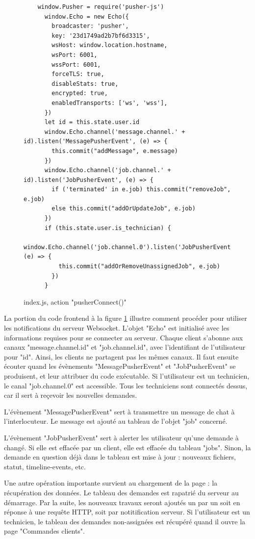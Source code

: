 \documentclass[
    iai, %
    eai, %
]{heig-tb}
\begin{document}
\begin{figure}[h]
  \begin{verbatim}
    window.Pusher = require('pusher-js')
      window.Echo = new Echo({
        broadcaster: 'pusher',
        key: '23d1749ad2b7bf6d3315',
        wsHost: window.location.hostname,
        wsPort: 6001,
        wssPort: 6001,
        forceTLS: true,
        disableStats: true,
        encrypted: true,
        enabledTransports: ['ws', 'wss'],
      })
      let id = this.state.user.id
      window.Echo.channel('message.channel.' + id).listen('MessagePusherEvent', (e) => {
        this.commit("addMessage", e.message)
      })
      window.Echo.channel('job.channel.' + id).listen('JobPusherEvent', (e) => {
        if ('terminated' in e.job) this.commit("removeJob", e.job)
        else this.commit("addOrUpdateJob", e.job)
      })
      if (this.state.user.is_technician) {
        window.Echo.channel('job.channel.0').listen('JobPusherEvent', (e) => {
          this.commit("addOrRemoveUnassignedJob", e.job)
        })
      }
  \end{verbatim}
  \caption{index.js, action "pusherConnect()"}
  \label{figure:pusherConnect}
\end{figure}

\newpage
La portion du code frontend à la figure \ref{figure:pusherConnect} illustre comment procéder pour utiliser les notifications du serveur Websocket. L'objet "Echo" est initialisé avec les informations requises pour se connecter au serveur. Chaque client s'abonne aux canaux "message.channel.{id}" et "job.channel.{id}", avec l'identifiant de l'utilisateur pour "{id}". Ainsi, les clients ne partagent pas les mêmes canaux. Il faut ensuite écouter quand les évènements "MessagePusherEvent" et "JobPusherEvent" se produisent, et leur attribuer du code exécutable.
Si l'utilisateur est un technicien, le canal "job.channel.0" est accessible. Tous les techniciens sont connectés dessus, car il sert à reçevoir les nouvelles demandes.

L'évènement "MessagePusherEvent" sert à transmettre un message de chat à l'interlocuteur. Le message est ajouté au tableau de l'objet "job" concerné.

L'évènement "JobPusherEvent" sert à alerter les utilisateur qu'une demande à changé. Si elle est effacée par un client, elle est effacée du tableau "jobs". Sinon, la demande en question déjà dans le tableau est mise à jour : nouveaux fichiers, statut, timeline-events, etc.

Une autre opération importante survient au chargement de la page : la récupération des données. Le tableau des demandes est rapatrié du serveur au démarrage. Par la suite, les nouveaux travaux seront ajoutés un par un soit en réponse à une requête HTTP, soit par notitification serveur.
Si l'utilisateur est un technicien, le tableau des demandes non-assignées est récupéré quand il ouvre la page "Commandes clients".
\end{document}
